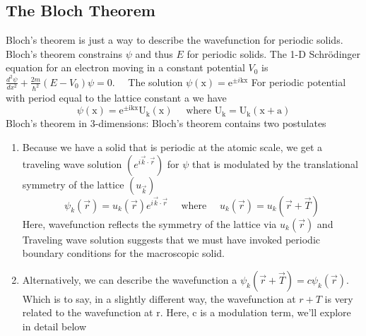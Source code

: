 \subsection{The Bloch Theorem}
Bloch's theorem is just a way to describe the wavefunction for periodic solids. Bloch's theorem constrains $\psi$ and thus $E$ for periodic solids.
The 1-D Schrödinger equation for an electron moving in a constant potential $V_{0}$ is $\frac{d^{2} \psi}{d x^{2}}+\frac{2 m}{\hbar^{2}}\left(E-V_{0}\right) \psi=0 . \quad$ The solution $\psi(\mathrm{x})=\mathrm{e}^{\pm i \mathrm{kx}}$
For periodic potential with period equal to the lattice constant a we have
$$
\psi(\mathrm{x})=\mathrm{e}^{\pm \mathrm{ikx}} \mathrm{U}_{\mathrm{k}}(\mathrm{x}) \quad \text { where } \mathrm{U}_{\mathrm{k}}=\mathrm{U}_{\mathrm{k}}(\mathrm{x}+\mathrm{a})
$$
Bloch's theorem in 3-dimensions: Bloch's theorem contains two postulates
\begin{enumerate}
	\item  Because we have a solid that is periodic at the atomic scale, we get a traveling wave solution $\left(e^{i \vec{k} \cdot \vec{r}}\right)$ for $\psi$ that is modulated by the translational symmetry of the lattice $\left(u_{\vec{k}}\right)$
	$$
	\psi_{k}(\vec{r})=u_{k}(\vec{r}) e^{i \vec{k} \cdot \vec{r}} \quad \text { where } \quad u_{k}(\vec{r})=u_{k}(\vec{r}+\vec{T})
	$$
	Here, wavefunction reflects the symmetry of the lattice via $u_{k}(\vec{r})$ and Traveling wave solution suggests that we must have invoked periodic boundary conditions for the macroscopic solid.
	\item Alternatively, we can describe the wavefunction a $\psi_{k}(\vec{r}+\vec{T})=c \psi_{k}(\vec{r})$. Which is to say, in a slightly different way, the wavefunction at $r+T$ is very related to the wavefunction at $\mathrm{r}$. Here, $\mathrm{c}$ is a modulation term, we'll explore in detail below
\end{enumerate}
